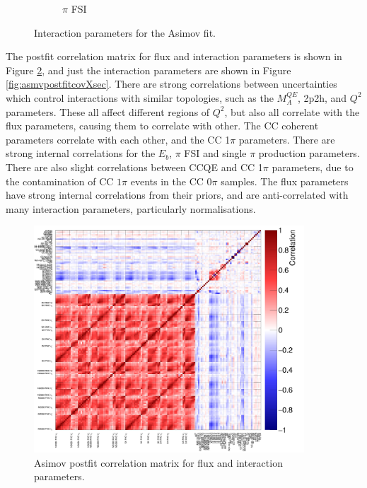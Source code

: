 \begin{figure}[!htbp]
\begin{subfigure}{0.49\textwidth}
  \caption{$\pi$ FSI}
\end{subfigure}
\caption{Interaction parameters for the Asimov fit.}
\label{fig:asmvxsec}
\end{figure}

The postfit correlation matrix for flux and interaction parameters is shown in Figure \ref{fig:asmvpostfitcov}, and just the interaction parameters are shown in Figure \ref{fig:asmvpostfitcovXsec}. There are strong correlations between uncertainties which control interactions with similar topologies, such as the $M^{QE}_A$, 2p2h, and $Q^2$ parameters. These all affect different regions of $Q^2$, but also all correlate with the flux parameters, causing them to correlate with other. The CC coherent parameters correlate with each other, and the CC 1$\pi$ parameters. There are strong internal correlations for the $E_b$, $\pi$ FSI and single $\pi$ production parameters. There are also slight correlations between CCQE and CC 1$\pi$ parameters, due to the contamination of CC $1\pi$ events in the CC 0$\pi$ samples. The flux parameters have strong internal correlations from their priors, and are anti-correlated with many interaction parameters, particularly normalisations.

\begin{figure}[!htbp]
\centering
\includegraphics*[width=0.9\textwidth,clip]{figs/Mach3AsmvCorr}
\caption{Asimov postfit correlation matrix for flux and interaction parameters.}\label{fig:asmvpostfitcov}
\end{figure}

